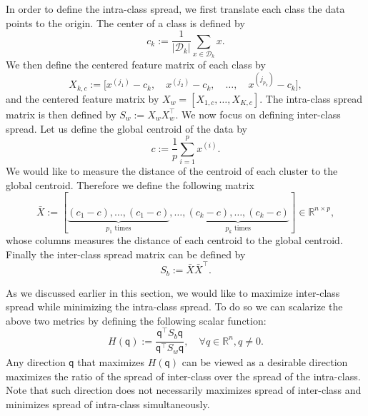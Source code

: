 \documentclass[11pt]{article}
\newcommand{\R}{\mathbb{R}}
\newcommand{\D}{\mathcal{D}}
\newcommand{\q}{\textsf{q}}
\begin{document}
In order to define the intra-class spread, we first translate each
class the data points to the origin. The center of a class is defined
by
\begin{equation}
  c_k := \frac{1}{|\D_k|} \sum_{x \in \D_k} x.
\end{equation}
We then define the centered feature matrix of each class by
\begin{equation}
  X_{k, c} := \Big[x^{(j_1)}-c_k, \quad x^{(j_2)}-c_k, \quad \dots,
    \quad x^{(j_{p_k})}-c_k \Big],
\end{equation}
and the centered feature matrix by $X_w = [X_{1, c}, \dots, X_{K,
    c}]$.  The intra-class spread matrix is then defined by $S_w :=
X_w^{} X_w^{\top}$. We now focus on defining inter-class spread. Let
us define the global centroid of the data by
\begin{equation}
  c := \frac{1}{p} \sum_{i=1}^{p} x^{(i)}.
\end{equation}
We would like to measure the distance of the centroid of each cluster
to the global centroid. Therefore we define the following matrix
\begin{equation}
  \bar{X} := [ \underbrace{(c_1 - c), \dots, (c_1 - c)}_{p_1
      \text{ times}}, \dots, \underbrace{(c_k - c), \dots, (c_k
      - c)}_{p_k \text{ times}}] \in \R^{n \times p},
\end{equation}
whose columns measures the distance of each centroid to the global
centroid. Finally the inter-class spread matrix can be defined by
\begin{equation}
  S_b := \bar{X} \bar{X}^{\top}.
\end{equation}

As we discussed earlier in this section, we would like to maximize
inter-class spread while minimizing the intra-class spread. To do so
we can scalarize the above two metrics by defining the following
scalar function:
\begin{equation}
  H(\q) := \frac{ \q^{\top}_{} S_{b}^{} \q }{\q^{\top}_{}
    S_{w}^{} \q}, \quad \forall q \in \R^{n}, q \not = 0.
\end{equation}
Any direction $\q$ that maximizes $H(\q)$ can be viewed as a desirable
direction maximizes the ratio of the spread of inter-class over the
spread of the intra-class. Note that such direction does not
necessarily maximizes spread of inter-class and minimizes spread of
intra-class simultaneously.
\end{document}
